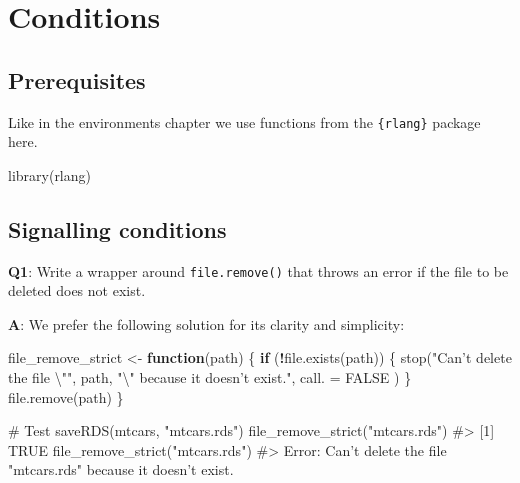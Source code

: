 \documentclass[
]{krantz}
\makeatletter
\newenvironment{Shaded}{\begin{snugshade}}{\end{snugshade}}
\newcommand{\CharTok}[1]{\textcolor[rgb]{0.31,0.60,0.02}{#1}}
\newcommand{\CommentTok}[1]{\textcolor[rgb]{0.56,0.35,0.01}{\textit{#1}}}
\newcommand{\ControlFlowTok}[1]{\textcolor[rgb]{0.13,0.29,0.53}{\textbf{#1}}}
\newcommand{\DataTypeTok}[1]{\textcolor[rgb]{0.13,0.29,0.53}{#1}}
\newcommand{\KeywordTok}[1]{\textcolor[rgb]{0.13,0.29,0.53}{\textbf{#1}}}
\newcommand{\NormalTok}[1]{#1}
\newcommand{\OperatorTok}[1]{\textcolor[rgb]{0.81,0.36,0.00}{\textbf{#1}}}
\newcommand{\OtherTok}[1]{\textcolor[rgb]{0.56,0.35,0.01}{#1}}
\newcommand{\StringTok}[1]{\textcolor[rgb]{0.31,0.60,0.02}{#1}}
\newenvironment{kframe}{%
\medskip{}
\setlength{\fboxsep}{.8em}
 \def\at@end@of@kframe{}%
 \ifinner\ifhmode%
  \def\at@end@of@kframe{\end{minipage}}%
  \begin{minipage}{\columnwidth}%
 \fi\fi%
 \def\FrameCommand##1{\hskip\@totalleftmargin \hskip-\fboxsep
 \colorbox{shadecolor}{##1}\hskip-\fboxsep
     \hskip-\linewidth \hskip-\@totalleftmargin \hskip\columnwidth}%
 \MakeFramed {\advance\hsize-\width
   \@totalleftmargin\z@ \linewidth\hsize
   \@setminipage}}%
 {\par\unskip\endMakeFramed%
 \at@end@of@kframe}
\renewenvironment{Shaded}{\begin{kframe}}{\end{kframe}}
\renewcommand{\KeywordTok} [1]{\textcolor[rgb]{0.00,0.44,0.13}{{#1}}}
\renewcommand{\DataTypeTok}[1]{\textcolor[rgb]{0.56,0.13,0.00}{{#1}}}
\renewcommand{\CharTok}    [1]{\textcolor[rgb]{0.25,0.44,0.63}{{#1}}}
\renewcommand{\StringTok}  [1]{\textcolor[rgb]{0.25,0.44,0.63}{{#1}}}
\renewcommand{\CommentTok} [1]{\textcolor[rgb]{0.38,0.63,0.69}{{#1}}}
\renewcommand{\OtherTok}   [1]{\textcolor[rgb]{0.00,0.44,0.13}{{#1}}}
\renewcommand{\NormalTok}  [1]{{#1}}
\makeatother
\begin{document}
\hypertarget{conditions}{%
\chapter{Conditions}\label{conditions}}

\hypertarget{prerequisites-2}{%
\section*{Prerequisites}\label{prerequisites-2}}


Like in the environments chapter we use functions from the \texttt{\{rlang\}} package here.

\begin{Shaded}
\begin{Highlighting}[]
\KeywordTok{library}\NormalTok{(rlang)}
\end{Highlighting}
\end{Shaded}


\hypertarget{signalling-conditions}{%
\section{Signalling conditions}\label{signalling-conditions}}

\textbf{{Q1}}: Write a wrapper around \texttt{file.remove()} that throws an error if the file to be deleted does not exist.

\textbf{{A}}: We prefer the following solution for its clarity and simplicity:

\begin{Shaded}
\begin{Highlighting}[]
\NormalTok{file_remove_strict <-}\StringTok{ }\ControlFlowTok{function}\NormalTok{(path) \{}
  \ControlFlowTok{if}\NormalTok{ (}\OperatorTok{!}\KeywordTok{file.exists}\NormalTok{(path)) \{}
    \KeywordTok{stop}\NormalTok{(}\StringTok{"Can't delete the file }\CharTok{\textbackslash{}"}\StringTok{"}\NormalTok{, path, }
         \StringTok{"}\CharTok{\textbackslash{}"}\StringTok{ because it doesn't exist."}\NormalTok{,}
         \DataTypeTok{call. =} \OtherTok{FALSE}
\NormalTok{    )}
\NormalTok{  \}}
  \KeywordTok{file.remove}\NormalTok{(path)}
\NormalTok{\}}

\CommentTok{# Test}
\KeywordTok{saveRDS}\NormalTok{(mtcars, }\StringTok{"mtcars.rds"}\NormalTok{)}
\KeywordTok{file_remove_strict}\NormalTok{(}\StringTok{"mtcars.rds"}\NormalTok{)}
\CommentTok{#> [1] TRUE}
\KeywordTok{file_remove_strict}\NormalTok{(}\StringTok{"mtcars.rds"}\NormalTok{)}
\CommentTok{#> Error: Can't delete the file "mtcars.rds" because it doesn't exist.}
\end{Highlighting}
\end{Shaded}
\end{document}
